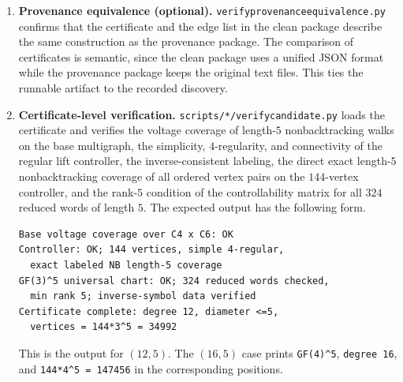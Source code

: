 \documentclass[11pt]{article}
\theoremstyle{definition}
\theoremstyle{remark}
\renewcommand{\_}{\textunderscore\allowbreak}
\begin{document}
\begin{enumerate}
\def\labelenumi{\arabic{enumi}.}
\setcounter{enumi}{-1}
\item
  \textbf{Provenance equivalence (optional).}
  \texttt{verify\_provenance\_equivalence.py} confirms that the certificate
  and the edge list in the clean package describe the same construction as
  the provenance package. The comparison of certificates is semantic, since
  the clean package uses a unified JSON format while the provenance package
  keeps the original text files. This ties the runnable artifact to the recorded
  discovery.
\item
  \textbf{Certificate-level verification.}
  \texttt{scripts/*/verify\_candidate.py} loads the certificate and verifies
  the voltage coverage of length-\(5\) nonbacktracking walks on the base
  multigraph, the simplicity, \(4\)-regularity, and connectivity of the
  regular lift controller, the inverse-consistent labeling, the direct
  exact length-\(5\) nonbacktracking coverage of all ordered vertex
  pairs on the \(144\)-vertex controller, and the
  rank-\(5\) condition of the controllability matrix for all \(324\) reduced
  words of length \(5\). The expected output has the following form.

{\small
\begin{verbatim}
Base voltage coverage over C4 x C6: OK
Controller: OK; 144 vertices, simple 4-regular,
  exact labeled NB length-5 coverage
GF(3)^5 universal chart: OK; 324 reduced words checked,
  min rank 5; inverse-symbol data verified
Certificate complete: degree 12, diameter <=5,
  vertices = 144*3^5 = 34992
\end{verbatim}
}

  This is the output for \((12,5)\). The \((16,5)\) case prints
  \texttt{GF(4)\^{}5}, \texttt{degree\ 16}, and
  \texttt{144*4\^{}5\ =\ 147456} in the corresponding positions.


\end{enumerate}
\end{document}
